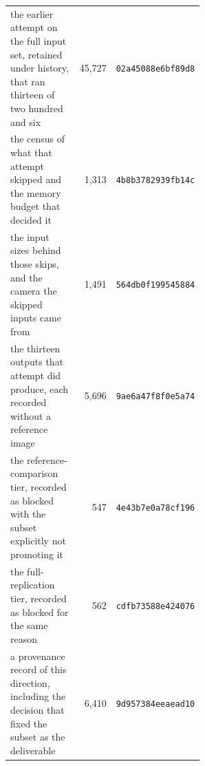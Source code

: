 \begin{tabular}{@{}p{0.56\linewidth}rl@{}}
the earlier attempt on the full input set, retained under history, that ran thirteen of two hundred and six & 45,727 & \texttt{02a45088e6bf89d8} \\
the census of what that attempt skipped and the memory budget that decided it &  1,313 & \texttt{4b8b3782939fb14c} \\
the input sizes behind those skips, and the camera the skipped inputs came from &  1,491 & \texttt{564db0f199545884} \\
the thirteen outputs that attempt did produce, each recorded without a reference image &  5,696 & \texttt{9ae6a47f8f0e5a74} \\
the reference-comparison tier, recorded as blocked with the subset explicitly not promoting it &    547 & \texttt{4e43b7e0a78cf196} \\
the full-replication tier, recorded as blocked for the same reason &    562 & \texttt{cdfb73588e424076} \\
a provenance record of this direction, including the decision that fixed the subset as the deliverable &  6,410 & \texttt{9d957384eeaead10} \\
\bottomrule
\end{tabular}
\endgroup
